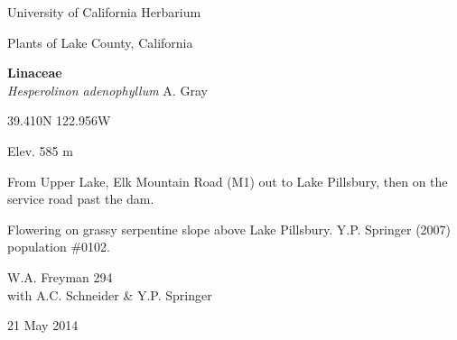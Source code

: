 \documentclass[letterpaper,10pt]{article}
\begin{document}
\begin{minipage}[t]{0.40\textwidth}

\begin{center}
University of California Herbarium \\
\begin{large}
Plants of Lake County, California \\
\end{large}
\vspace{\baselineskip}
\textbf{Linaceae} \\
\textit{Hesperolinon adenophyllum} A. Gray\\
\end{center}

\begin{footnotesize}

\begin{multicols}{2}
39.410\textdegree N 122.956\textdegree W
\columnbreak
\begin{flushright}
Elev. 585 m
\end{flushright}
\end{multicols}

From Upper Lake, Elk Mountain Road (M1) out to Lake Pillsbury, then on the service road past the dam.
\vspace{\baselineskip}

Flowering on grassy serpentine slope above Lake Pillsbury. Y.P. Springer (2007) population \#0102.

\begin{multicols}{2}
W.A. Freyman 294 \\
with A.C. Schneider \& Y.P. Springer
\columnbreak
\begin{flushright}
21 May 2014
\end{flushright}
\end{multicols}

\end{footnotesize}

\end{minipage}
%
\hspace{2cm}
%
\end{document}
